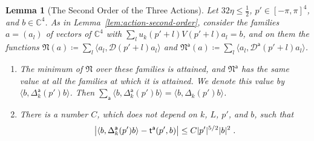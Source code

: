 \documentclass[11pt]{preprint}
\DeclarePairedDelimiter{\abs}{\lvert}{\rvert}
\numberwithin{equation}{section}
\newtheorem{lemma}[theorem]{Lemma}
\theoremstyle{definition}
\theoremstyle{remark}
\theoremstyle{plain}
\begin{document}
\begin{lemma}[The Second Order of the Three Actions]\label{lem:class-forms}
Let $32\eta \leq \frac12$, $p' \in [-\pi, \pi]^4$, and $b \in \mathbb C^4$. As in Lemma~\ref{lem:action-second-order}, consider the families $a = (a_l)$ of vectors of $\mathbb C^4$ with $\sum_lu_k(p' + l)V(p' + l)a_l = b$, and on them the functions $\mathfrak N(a) \coloneqq \sum_l\langle a_l, \mathcal D(p' + l)a_l\rangle$ and $\mathfrak N^{\mathsf a}(a) \coloneqq \sum_l\langle a_l, \mathcal D^{\mathsf a}(p' + l)a_l\rangle$.
\begin{enumerate}[label=(\roman*)]
\item The minimum of $\mathfrak N$ over these families is attained, and $\mathfrak N^{\mathsf a}$ has the same value at all the families at which it is attained. We denote this value by $\langle b, \Delta^{\mathsf a}_k(p')b\rangle$. Then $\sum_{\mathsf a}\langle b, \Delta^{\mathsf a}_k(p')b\rangle = \langle b, \Delta_k(p')b\rangle$.
\item There is a number $C$, which does not depend on $k$, $L$, $p'$, and $b$, such that
\begin{equation}\label{eq:class-forms}
    \bigl\lvert\langle b, \Delta^{\mathsf a}_k(p')b\rangle - \mathsf t^{\mathsf a}(p', b)\bigr\rvert \leq C\abs{p'}^{5/2}\abs b^2\;.
\end{equation}
\end{enumerate}
\end{lemma}
\end{document}
